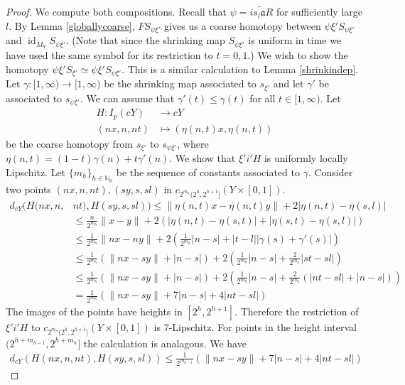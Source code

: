 \documentclass[10pt,a4paper]{amsart}
\DeclareMathOperator{\id}{id}
\begin{document}
\begin{proof} We compute both compositions. Recall that $\psi = \widetilde{is_{l}\mathfrak{a}R}$ for sufficiently large $l$. By Lemma \ref{globallycoarse}, $F S_{\psi \xi'}$ gives us a coarse homotopy between $\psi \xi' S_{\psi \xi'}$ and $\id_{M_{Y}}S_{\psi \xi'}$. (Note that since the shrinking map $S_{\psi \xi'}$ is uniform in time we have used the same symbol for its restriction to $t=0,1$.) We wish to show the homotopy $\psi \xi' S_{\xi'} \simeq \psi \xi' S_{\psi \xi'}$. This is a similar calculation to Lemma \ref{shrinkindep}. Let $\gamma: [1,\infty)\rightarrow [1,\infty)$ be the shrinking map associated to $s_{\xi'}$ and let $\gamma'$ be associated to $s_{\psi\xi'}$. We can assume that $\gamma'(t)\leq \gamma(t)$ for all $t\in [1,\infty)$. Let 
\begin{align*}
H: I_{p}(cY)&\rightarrow cY\\
(nx,n,nt)&\mapsto (\eta(n,t)x,\eta(n,t))
\end{align*}
be the coarse homotopy from $s_{\xi'}$ to $s_{\psi\xi'}$, where $\eta(n,t) = (1-t)\gamma(n)+t\gamma'(n)$.  We show that $\xi' i' H$ is uniformly locally Lipschitz. Let $\{m_{h}\}_{h\in \mathbb{N}_0}$ be the sequence of constants associated to $\gamma$. Consider two points $(nx,n,nt),(sy,s,sl)$ in $c_{2^{m_{h}}(2^{h},2^{h+1}]}(Y \times [0,1])$. 
\begin{align*}
d_{cY}(H(nx,n,&nt),H(sy,s,sl)) \leq \|\eta(n,t)x - \eta(n,t)y\| + 2|\eta(n,t)-\eta(s,l)|\\
&\leq \frac{n}{2^{m_{h}}} \|x-y\| + 2(|\eta(n,t)-\eta(s,t)|+|\eta(s,t)-\eta(s,l)|)\\
&\leq \frac{1}{2^{m_{h}}} \|nx-ny\|+2(\frac{1}{2^{m_{h}}}|n-s|+|t-l||\gamma(s)+\gamma'(s)|)\\
&\leq \frac{1}{2^{m_{h}}} (\|nx-sy\| + |n-s|) + 2(\frac{1}{2^{m_{h}}}|n-s| +\frac{2}{2^{m_{h}}}|st-sl|)\\
&\leq \frac{1}{2^{m_{h}}} (\|nx-sy\| + |n-s|) + 2(\frac{1}{2^{m_{h}}}|n-s| + \frac{2}{2^{m_{h}}}(|nt-sl|+|n-s|))\\
&= \frac{1}{2^{m_{h}}}(\|nx-sy\| + 7|n-s| + 4|nt-sl|)
\end{align*}
The images of the points have heights in $[2^h,2^{h+1}]$. Therefore the restriction of $\xi' i' H$ to $c_{2^{m_{h}}(2^{h},2^{h+1}]}(Y \times [0,1])$ is $7$-Lipschitz. For points in the height interval $(2^{h+m_{h-1}},2^{h+m_{h}}]$ the calculation is analagous. We have  
\begin{align*}
d_{cY}(H(nx,n,nt),H(sy,s,sl)) \leq \frac{1}{2^{m_{h-1}}}(\|nx-sy\| + 7|n-s| + 4|nt-sl|)

\end{align*}
\end{proof}
\end{document}
